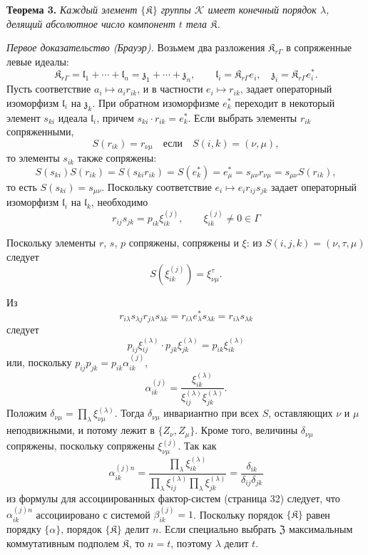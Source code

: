 \documentclass[11pt]{article}
\begin{document}
\textbf{Теорема 3.} \emph{Каждый элемент \(\{\mathfrak K\}\) группы \(\mathscr K\) имеет конечный порядок \(\lambda\), делящий абсолютное число компонент \(t\) тела \(\mathfrak K\).}

\emph{Первое доказательство (Брауэр).} Возьмем два разложения \(\mathfrak K_{r\Gamma}\) в сопряженные левые идеалы:
\[
\mathfrak K_{r\Gamma}=\mathfrak l_1+\cdots+\mathfrak l_n=\mathfrak z_1+\cdots+\mathfrak z_n,\qquad
\mathfrak l_i=\mathfrak K_{r\Gamma}e_i,\quad
\mathfrak z_i=\mathfrak K_{r\Gamma}e_i^*.
\]
Пусть соответствие \(a_i\mapsto a_ir_{ik}\), и в частности \(e_i\mapsto r_{ik}\), задает операторный изоморфизм \(\mathfrak l_i\) на \(\mathfrak z_k\). При обратном изоморфизме \(e_k^*\) переходит в некоторый элемент \(s_{ki}\) идеала \(\mathfrak l_i\), причем \(s_{ki}\cdot r_{ik}=e_k^*\). Если выбрать элементы \(r_{ik}\) сопряженными,
\[
S(r_{ik})=r_{\nu\mu}\quad\text{если}\quad S(i,k)=(\nu,\mu),
\]
то элементы \(s_{ik}\) также сопряжены:
\[
S(s_{ki})S(r_{ik})=S(s_{ki}r_{ik})=S(e_k^*)=e_\mu^*
=s_{\mu\nu}r_{\nu\mu}=s_{\mu\nu}S(r_{ik}),
\]
то есть \(S(s_{ki})=s_{\mu\nu}\). Поскольку соответствие \(e_i\mapsto e_ir_{ij}s_{jk}\) задает операторный изоморфизм \(\mathfrak l_i\) на \(\mathfrak l_k\), необходимо
\[
r_{ij}s_{jk}=p_{ik}\xi_{ik}^{(j)},\qquad
\xi_{ik}^{(j)}\ne0\in\Gamma
\]

Поскольку элементы \(r\), \(s\), \(p\) сопряжены, сопряжены и \(\xi\): из \(S(i,j,k)=(\nu,\tau,\mu)\) следует
\[
S(\xi_{ik}^{(j)})=\xi_{\nu\mu}^{\tau}.
\]

Из
\[
r_{i\lambda}s_{\lambda j}r_{j\lambda}s_{\lambda k}
=r_{i\lambda}e_\lambda^*s_{\lambda k}
=r_{i\lambda}s_{\lambda k}
\]
следует
\[
p_{ij}\xi_{ij}^{(\lambda)}\cdot p_{jk}\xi_{jk}^{(\lambda)}
=p_{ik}\xi_{ik}^{(\lambda)}
\]
или, поскольку \(p_{ij}p_{jk}=p_{ik}\alpha_{ik}^{(j)}\),
\[
\alpha_{ik}^{(j)}
=\frac{\xi_{ik}^{(\lambda)}}{\xi_{ij}^{(\lambda)}\xi_{jk}^{(\lambda)}}.
\]
Положим \(\delta_{\nu\mu}=\prod_{\lambda}\xi_{\nu\mu}^{(\lambda)}\). Тогда \(\delta_{\nu\mu}\) инвариантно при всех \(S\), оставляющих \(\nu\) и \(\mu\) неподвижными, и потому лежит в \(\{Z_\nu,Z_\mu\}\). Кроме того, величины \(\delta_{\nu\mu}\) сопряжены, поскольку сопряжены \(\xi_{\nu\mu}^{(j)}\). Так как
\[
\alpha_{ik}^{(j)n}
=\frac{\prod_{\lambda}\xi_{ik}^{(\lambda)}}
       {\prod_{\lambda}\xi_{ij}^{(\lambda)}\prod_{\lambda}\xi_{jk}^{(\lambda)}}
=\frac{\delta_{ik}}{\delta_{ij}\delta_{jk}}
\]
из формулы для ассоциированных фактор-систем (страница 32) следует, что \(\alpha_{ik}^{(j)n}\) ассоциировано с системой \(\beta_{ik}^{(j)}=1\). Поскольку порядок \(\{\mathfrak K\}\) равен порядку \(\{\alpha\}\), порядок \(\{\mathfrak K\}\) делит \(n\). Если специально выбрать \(\mathfrak Z\) максимальным коммутативным подполем \(\mathfrak K\), то \(n=t\), поэтому \(\lambda\) делит \(t\).
\end{document}
